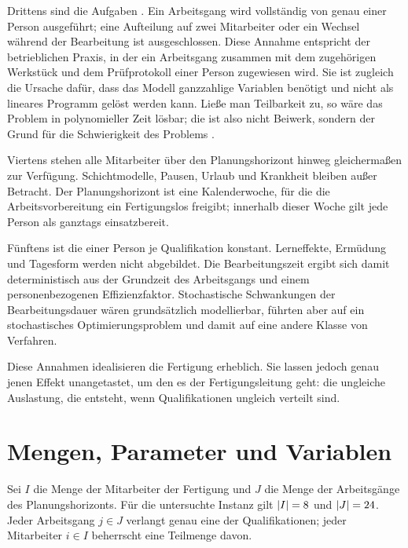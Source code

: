 Drittens sind die Aufgaben . Ein Arbeitsgang wird vollständig
von genau einer Person ausgeführt; eine Aufteilung auf zwei Mitarbeiter oder ein
Wechsel während der Bearbeitung ist ausgeschlossen. Diese Annahme entspricht der
betrieblichen Praxis, in der ein Arbeitsgang zusammen mit dem zugehörigen
Werkstück und dem Prüfprotokoll einer Person zugewiesen wird. Sie ist zugleich
die Ursache dafür, dass das Modell ganzzahlige Variablen benötigt und nicht als
lineares Programm gelöst werden kann. Ließe man Teilbarkeit zu, so wäre das
Problem in polynomieller Zeit lösbar; die  ist
also nicht Beiwerk, sondern der Grund für die Schwierigkeit des Problems
\parencite{garey1979computers}.

Viertens stehen alle Mitarbeiter über den Planungshorizont hinweg gleichermaßen
zur Verfügung. Schichtmodelle, Pausen, Urlaub und Krankheit bleiben außer
Betracht. Der Planungshorizont ist eine Kalenderwoche, für die die
Arbeitsvorbereitung ein Fertigungslos freigibt; innerhalb dieser Woche gilt jede
Person als ganztags einsatzbereit.

Fünftens ist die  einer Person je Qualifikation konstant.
Lerneffekte, Ermüdung und Tagesform werden nicht abgebildet. Die
Bearbeitungszeit ergibt sich damit deterministisch aus der Grundzeit des
Arbeitsgangs und einem personenbezogenen Effizienzfaktor. Stochastische
Schwankungen der Bearbeitungsdauer wären grundsätzlich modellierbar, führten
aber auf ein stochastisches Optimierungsproblem und damit auf eine andere
Klasse von Verfahren.

Diese Annahmen idealisieren die Fertigung erheblich. Sie lassen jedoch genau
jenen Effekt unangetastet, um den es der Fertigungsleitung geht: die ungleiche
Auslastung, die entsteht, wenn Qualifikationen ungleich verteilt sind.

\section{Mengen, Parameter und Variablen}
\label{sec:mengen}

Sei $I$ die Menge der Mitarbeiter der Fertigung und $J$ die Menge der
Arbeitsgänge des Planungshorizonts. Für die untersuchte Instanz gilt
$|I| = 8{}$ und $|J| = 24{}$. Jeder Arbeitsgang
$j \in J$ verlangt genau eine der \ZahlQualifikationen{} Qualifikationen; jeder
Mitarbeiter $i \in I$ beherrscht eine Teilmenge davon.

